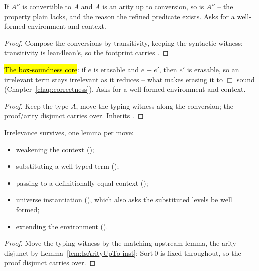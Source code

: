 \begin{lemma}
\label{lem:IsArityUpTo-defeq}
\leanok
{}
 If $A''$ is convertible to $A$ and $A$ is an arity up to conversion, so is $A''$ -- the property plain  lacks, and the reason the refined predicate exists.
 Asks for a well-formed environment and context.
\end{lemma}
\begin{proof}
\leanok
{}
 Compose the conversions by transitivity, keeping the syntactic witness; transitivity is lean4lean's, so the footprint carries .
\end{proof}

\begin{lemma}
\label{lem:Erasable-defeq}
\leanok
{}
 \hl{The box-soundness core}: if $e$ is erasable and $e \equiv e'$, then $e'$ is erasable, so an irrelevant term stays irrelevant as it reduces -- what makes erasing it to $\Box$ sound (Chapter~\ref{chap:correctness}).
 Asks for a well-formed environment and context.
\end{lemma}
\begin{proof}
\leanok
{}
 Keep the type $A$, move the typing witness along the conversion; the proof/arity disjunct carries over. Inherits .
\end{proof}

\begin{lemma}
\label{lem:Erasable-weakN}
\leanok
{}
 Irrelevance survives, one lemma per move:
\begin{itemize}
\item weakening the context ();
\item substituting a well-typed term ();
\item passing to a definitionally equal context ();
\item universe instantiation (), which also asks the substituted levels be well formed;
\item extending the environment ().
\end{itemize}
\end{lemma}
\begin{proof}
\leanok
{}
 Move the typing witness by the matching upstream lemma, the arity disjunct by Lemma~\ref{lem:IsArityUpTo-inst}; $\mathrm{Sort}\ 0$ is fixed throughout, so the proof disjunct carries over.
\end{proof}

